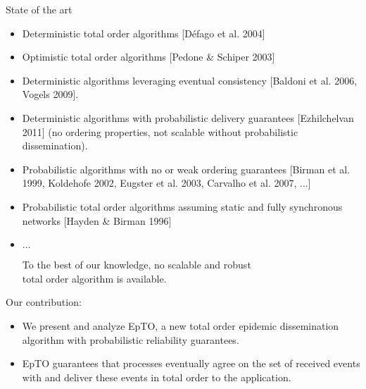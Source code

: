 \begin{frame}{State of the art}
  
\begin{itemize}

\item Deterministic total order algorithms [Défago et al. 2004]

\item Optimistic total order algorithms [Pedone \& Schiper 2003]

\item Deterministic algorithms leveraging eventual consistency [Baldoni et al. 2006, Vogels 2009]. 

\item Deterministic algorithms with probabilistic delivery guarantees [Ezhilchelvan 2011] (no ordering properties, not scalable without probabilistic dissemination).

\item Probabilistic algorithms with no or weak ordering guarantees [Birman et al. 1999, Koldehofe 2002, Eugster et al. 2003, Carvalho et al. 2007, ...]

\item Probabilistic total order algorithms assuming static and fully synchronous networks [Hayden \& Birman 1996]

\item $\dots$

  \begin{snugshade}
    To the best of our knowledge, no scalable and robust \\ total order algorithm is available.
  \end{snugshade}

\end{itemize}

\end{frame}


\subtitle[Properties]{Properties}


\begin{frame}{Our contribution: \EPTO}
  
  \begin{itemize}

  \item We present and analyze EpTO, a new total order epidemic dissemination algorithm with probabilistic reliability guarantees. 

  \item EpTO guarantees that processes eventually agree on the set of received events with  and deliver these events in total order to the application. 
  \end{itemize}
  
\end{frame}

